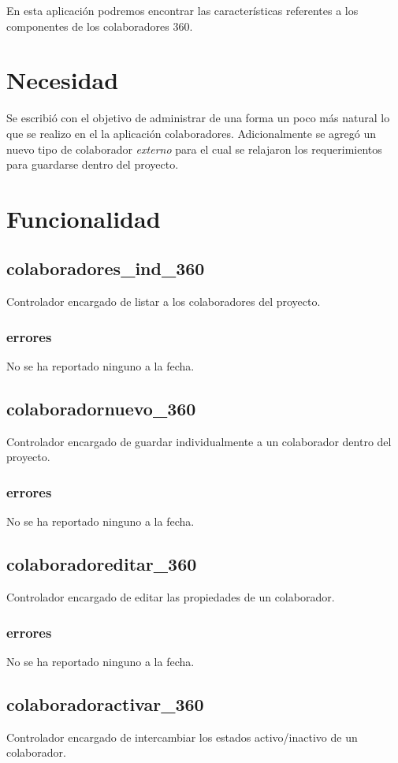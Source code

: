 \documentclass[10pt,a4paper]{book}
\begin{document}
	En esta aplicación podremos encontrar las características referentes a los componentes de los colaboradores 360.
	
	\section{Necesidad}
	
	Se escribió con el objetivo de administrar de una forma un poco más natural lo que se realizo en el la aplicación colaboradores. Adicionalmente se agregó un nuevo tipo de colaborador \textit{externo} para el cual se relajaron los requerimientos para guardarse dentro del proyecto.

	\section{Funcionalidad}


	\subsection{colaboradores\_ind\_360}
	Controlador encargado de listar a los colaboradores del proyecto.
	\subsubsection{errores}
	No se ha reportado ninguno a la fecha.
	
	\subsection{colaboradornuevo\_360}
	Controlador encargado de guardar individualmente a un colaborador dentro del proyecto.
	\subsubsection{errores}
	No se ha reportado ninguno a la fecha.
	
	\subsection{colaboradoreditar\_360}
	Controlador encargado de editar las propiedades de un colaborador.
	\subsubsection{errores}
	No se ha reportado ninguno a la fecha.
	
	\subsection{colaboradoractivar\_360}
	Controlador encargado de intercambiar los estados activo/inactivo de un colaborador.
\end{document}
